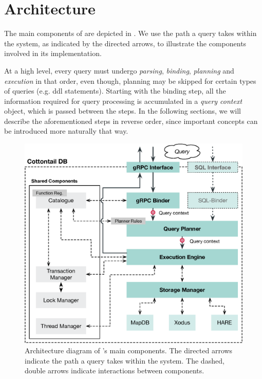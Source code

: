 \section{Architecture} 

The main components of \cottontail{} are depicted in . We use the path a query takes within the system, as indicated by the directed arrows, to illustrate the components involved in its implementation.

At a high level, every query must undergo \emph{parsing}, \emph{binding}, \emph{planning} and \emph{execution} in that order, even though, planning may be skipped for certain types of queries (e.g. \acrshort{ddl} statements). Starting with the binding step, all the information required for query processing is accumulated in a \emph{query context} object, which is passed between the steps. In the following sections, we will describe the aforementioned steps in reverse order, since important concepts can be introduced more naturally that way.

\begin{figure}[bt]
    \centering
    \includegraphics[width=\textwidth]{figures/architecture.eps}
    \caption{Architecture diagram of \cottontail{}'s main components. The directed arrows indicate the path a query takes within the system. The dashed, double arrows indicate interactions between components.}
    \label{figure:cottontail_architecture}
\end{figure}


